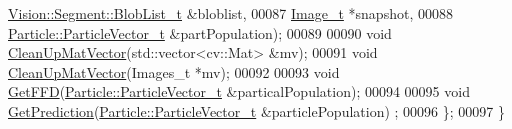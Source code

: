 \begin{DoxyCode}
      \hyperlink{class_vision_1_1_segment_a60e08251e2ab94239e245044c31cde51}{Vision::Segment::BlobList\_t} &bloblist,
00087                                 \hyperlink{struct_soil_analyzer_1_1_analyzer_1_1_image__t}{Image\_t} *snapshot,
00088                                 \hyperlink{class_soil_analyzer_1_1_particle_a4e43dab999d36d5a5f809bb4be5ff3a7}{Particle::ParticleVector\_t} &partPopulation);
00089 
00090   \textcolor{keywordtype}{void} \hyperlink{class_soil_analyzer_1_1_analyzer_a9b143f9920d90ecd54a3b0bb3b0e28fc}{CleanUpMatVector}(std::vector<cv::Mat> &mv);
00091   \textcolor{keywordtype}{void} \hyperlink{class_soil_analyzer_1_1_analyzer_a9b143f9920d90ecd54a3b0bb3b0e28fc}{CleanUpMatVector}(Images\_t *mv);
00092 
00093   \textcolor{keywordtype}{void} \hyperlink{class_soil_analyzer_1_1_analyzer_aeed5e3b158ff37d5fecb2816e12c3c31}{GetFFD}(\hyperlink{class_soil_analyzer_1_1_particle_a4e43dab999d36d5a5f809bb4be5ff3a7}{Particle::ParticleVector\_t} &particalPopulation);
00094 
00095   \textcolor{keywordtype}{void} \hyperlink{class_soil_analyzer_1_1_analyzer_a7eb1a2676660f536b366f9aaf1326f80}{GetPrediction}(\hyperlink{class_soil_analyzer_1_1_particle_a4e43dab999d36d5a5f809bb4be5ff3a7}{Particle::ParticleVector\_t} &particlePopulation)
      ;
00096 \};
00097 \}
\end{DoxyCode}

